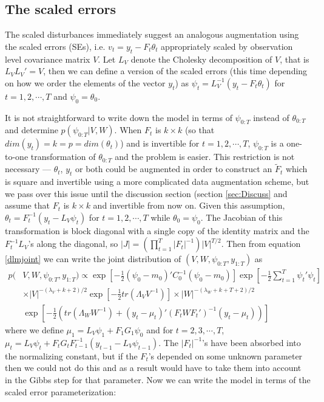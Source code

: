 \documentclass{article}
\begin{document}
\subsection{The scaled errors}\label{sec:scalederrors}
The scaled disturbances immediately suggest an analogous augmentation using the scaled errors (SEs), i.e. $v_t=y_t - F_t\theta_t$ appropriately scaled by observation level covariance matrix $V$. Let $L_V$ denote the Cholesky decomposition of $V$, that is $L_VL_V'=V$, then we can define a version of the scaled errors (this time depending on how we order the elements of the vector $y_t$) as $\psi_t = L_V^{-1}(y_t - F_t\theta_t)$ for $t=1,2,\cdots,T$ and $\psi_0 = \theta_0$. 

It is not straightforward to write down the model in terms of $\psi_{0:T}$ instead of $\theta_{0:T}$ and determine $p(\psi_{0:T}|V,W)$. When $F_t$ is $k\times k$ (so that $dim(y_t)=k=p=dim(\theta_t)$) and is invertible for $t=1,2,\cdots,T$, $\psi_{0:T}$ is a one-to-one transformation of $\theta_{0:T}$ and the problem is easier. This restriction is not necessary --- $\theta_t$, $y_t$ or both could be augmented in order to construct an $\tilde{F}_t$ which is square and invertible using a more complicated data augmentation scheme, but we pass over this issue until the discussion section (section \ref{sec:Discuss} and assume that $F_t$ is $k\times k$ and invertible from now on. Given this assumption, $\theta_t = F_t^{-1}(y_t - L_V\psi_t)$ for $t=1,2,\cdots,T$ while $\theta_0=\psi_0$. The Jacobian of this transformation is block diagonal with a single copy of the identity matrix and the $F_t^{-1}L_V$'s along the diagonal, so $|J|=(\prod_{t=1}^T|F_t|^{-1})|V|^{T/2}$. Then from equation \eqref{dlmjoint} we can write the joint distribution of $(V, W, \psi_{0:T}, y_{1:T})$ as
\begin{align}
    p(&V,W,\psi_{0:T},y_{1:T}) \propto \exp\left[-\frac{1}{2}(\psi_0-m_0)'C_0^{-1}(\psi_0-m_0)\right] \exp\left[-\frac{1}{2}\sum_{t=1}^T\psi_t'\psi_t\right] \nonumber\\
  &\times |V|^{-(\lambda_V + k + 2)/2}\exp\left[-\frac{1}{2}tr\left(\Lambda_VV^{-1}\right)\right]  \times |W|^{-(\lambda_W + k + T + 2)/2} \nonumber\\
   & \exp\left[-\frac{1}{2}\left(tr\left(\Lambda_WW^{-1}\right) + (y_t - \mu_t)'(F_tWF_t')^{-1}(y_t-\mu_t)\right)\right]\label{dlmerrorjoint}
\end{align}
where we define $\mu_1 = L_V\psi_1 + F_1G_1\psi_0$ and for $t=2,3,\cdots,T$, $\mu_t =L_V\psi_t + F_tG_tF_{t-1}^{-1}(y_{t-1} - L_{V}\psi_{t-1})$. The $|F_t|^{-1}$'s have been absorbed into the normalizing constant, but if the $F_t$'s depended on some unknown parameter then we could not do this and as a result would have to take them into account in the Gibbs step for that parameter. Now we can write the model in terms of the scaled error parameterization:
\end{document}
